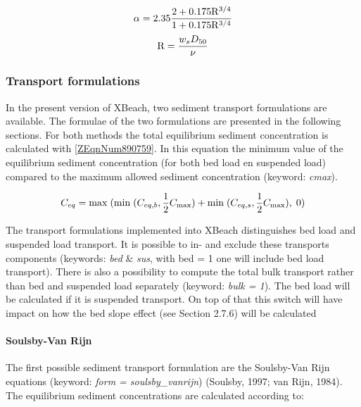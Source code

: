 \documentclass{article}
\begin{document}
\noindent 
\begin{equation} \label{2.86)} 
\alpha =2.35\frac{2+0.175{\rm R}^{3/4} }{1+0.175{\rm R}^{3/4} }  
\end{equation} 
\begin{equation} \label{2.87)} 
{\rm R}=\frac{w_{s} D_{50} }{\nu }  
\end{equation} 


\subsubsection{ Transport formulations}

\noindent In the present version of XBeach, two sediment transport formulations are available. The formulae of the two formulations are presented in the following sections. For both methods the total equilibrium sediment concentration is calculated with \eqref{ZEqnNum890759}. In this equation the minimum value of the equilibrium sediment concentration (for both bed load en suspended load) compared to the maximum allowed sediment concentration (keyword: \textit{cmax}).  

\noindent 
\begin{equation} \label{ZEqnNum890759} 
C_{eq} ={\rm max\; }({\rm min\; }(C_{eq,b} ,\frac{1}{2} C_{\max } )+{\rm min\; }(C_{eq,s} ,\frac{1}{2} C_{\max } ),{\rm \; }0) 
\end{equation} 


\noindent The transport formulations implemented into XBeach distinguishes bed load and suspended load transport. It is possible to in- and exclude these transports components (keywords: \textit{bed} \& \textit{sus}, with bed = 1 one will include bed load transport). There is also a possibility to compute the total bulk transport rather than bed and suspended load separately (keyword: \textit{bulk = 1}). The bed load will be calculated if it is suspended transport. On top of that this switch will have impact on how the bed slope effect (see Section 2.7.6) will be calculated 


\paragraph{ Soulsby-Van Rijn}

\noindent The first possible sediment transport formulation are the Soulsby-Van Rijn equations (keyword: \textit{form = soulsby\_vanrijn}) (Soulsby, 1997; van Rijn, 1984). The equilibrium sediment concentrations are calculated according to:
\end{document}
